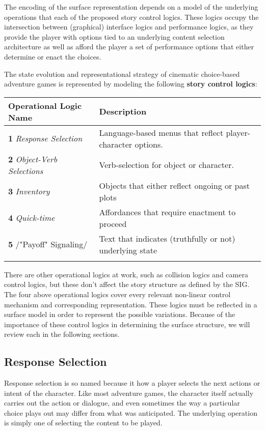 The encoding of the surface representation depends on a model of the
underlying operations that each of the proposed story control
logics. These logics occupy the intersection between (graphical)
interface logics and performance logics, as they provide the player
with options tied to an underlying content selection architecture as
well as afford the player a set of performance options that either
determine or enact the choices.

The state evolution and representational strategy of cinematic
choice-based adventure games is represented by modeling the following
\textbf{story control logics}:

\begin{center}
\begin{tabular}{ll}
Operational Logic Name & Description\\
\hline
\textbf{1} \emph{Response Selection} & Language-based menus that reflect player-character options.\\
\textbf{2} \emph{Object-Verb Selections} & Verb-selection for object or character.\\
\textbf{3} \emph{Inventory} & Objects that either reflect ongoing or past plots\\
\textbf{4} \emph{Quick-time} & Affordances that require enactment to proceed\\
\textbf{5} /"Payoff" Signaling/ & Text that indicates (truthfully or not) underlying state\\
 & \\
\end{tabular}
\end{center}

There are other operational logics at work, such as collision logics
and camera control logics, but these don't affect the story structure
as defined by the SIG. The four above operational logics cover every
relevant non-linear control mechanism and corresponding
representation. These logics must be reflected in a surface model in
order to represent the possible variations. Because of the importance
of these control logics in determining the surface structure, we will
review each in the following sections.

\subsection{Response Selection}
\label{sec:orgheadline1}
Response selection is so named because it how a player selects the
next actions or intent of the character. Like most adventure games,
the character itself actually carries out the action or dialogue, and
even sometimes the way a particular choice plays out may differ from
what was anticipated. The underlying operation is simply one of
selecting the content to be played.

